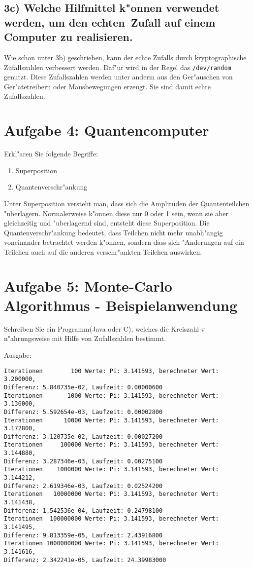 \documentclass{scrartcl}
\begin{document}
\subsection*{3c) Welche Hilfmittel k"onnen verwendet werden, um den \dq 
echten\dq ~Zufall auf einem Computer zu realisieren.}
Wie schon unter 3b) geschrieben, kann der echte Zufalls durch 
kryptographische 
Zufallszahlen verbessert werden. Daf"ur wird in der Regel das 
\texttt{/dev/random} genutzt. Diese Zufallszahlen werden unter anderm 
aus den 
Ger"auschen von Ger"atetreibern oder Mausbewegungen erzeugt. Sie sind 
damit 
echte Zufallszahlen.

\section*{Aufgabe 4: Quantencomputer}
{\large{Erkl"aren Sie folgende Begriffe:
\begin{enumerate}
\item Superposition
\item Quantenverschr"ankung
\end{enumerate}}}
Unter Superposition versteht man, dass sich die Amplituden der 
Quantenteilchen 
"uberlagern. Normalerweise k"onnen diese nur 0 oder 1 sein, wenn sie aber 
gleichzeitig und "uberlagernd sind, entsteht diese Superposition. Die 
Quantenverschr"ankung bedeutet, dass Teilchen nicht mehr unabh"angig 
voneinander betrachtet werden k"onnen, sondern dass sich "Anderungen 
auf 
ein 
Teilchen auch auf die anderen verschr"ankten Teilchen auswirken. 

\section*{Aufgabe 5: Monte-Carlo Algorithmus - Beispielanwendung}
{\large{Schreiben Sie ein Programm(Java oder C), welches die Kreiszahl $\pi$ 
n"ahrungsweise mit Hilfe von Zufallszahlen bestimmt.}}

Ausgabe:
\begin{lstlisting}
Iterationen        100 Werte: Pi: 3.141593, berechneter Wert: 3.200000, 
Differenz: 5.840735e-02, Laufzeit: 0.00000600
Iterationen       1000 Werte: Pi: 3.141593, berechneter Wert: 3.136000, 
Differenz: 5.592654e-03, Laufzeit: 0.00002800
Iterationen      10000 Werte: Pi: 3.141593, berechneter Wert: 3.172800, 
Differenz: 3.120735e-02, Laufzeit: 0.00027200
Iterationen     100000 Werte: Pi: 3.141593, berechneter Wert: 3.144880, 
Differenz: 3.287346e-03, Laufzeit: 0.00275100
Iterationen    1000000 Werte: Pi: 3.141593, berechneter Wert: 3.144212, 
Differenz: 2.619346e-03, Laufzeit: 0.02524200
Iterationen   10000000 Werte: Pi: 3.141593, berechneter Wert: 3.141438, 
Differenz: 1.542536e-04, Laufzeit: 0.24798100
Iterationen  100000000 Werte: Pi: 3.141593, berechneter Wert: 3.141495, 
Differenz: 9.813359e-05, Laufzeit: 2.43916800
Iterationen 1000000000 Werte: Pi: 3.141593, berechneter Wert: 3.141616, 
Differenz: 2.342241e-05, Laufzeit: 24.39983000
\end{lstlisting}
\end{document}
